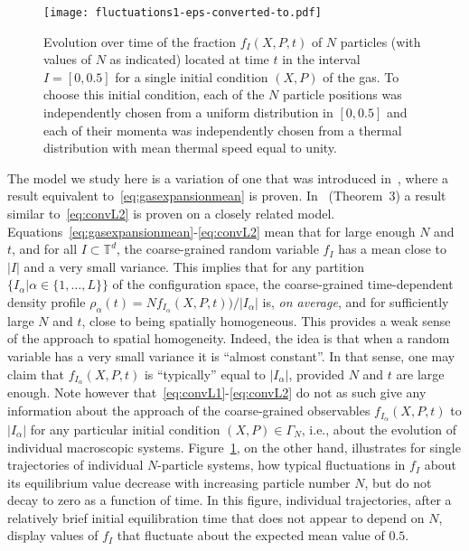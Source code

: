 \documentclass{article}
\newcommand {\T}{\mathbb{T}}
\numberwithin{equation}{section}
\begin{document}
\begin{figure}[t]
\captionsetup{width=0.85\textwidth}
\texttt{[image: fluctuations1-eps-converted-to.pdf]}
\centering
\caption{Evolution over time of the fraction $f_{I}(X,P,t)$ of $N$ particles (with values of $N$ as
indicated) located at time $t$ in the interval $I = [0,0.5]$ for a single initial
condition $(X,P)$ of the gas. To choose this initial condition, each of
the $N$ particle positions was independently chosen  from a uniform distribution in $[0, 0.5]$
and  each of their momenta was independently chosen from a thermal distribution with mean
thermal speed equal to unity.}
\label{fig:fluctuations1}
\end{figure}

The model we study here is a variation of one that was introduced in~\cite{Fr58},
where a result equivalent to~\eqref{eq:gasexpansionmean} is proven. In~\cite{Be10} (Theorem~3) a result similar to~\eqref{eq:convL2} is proven on a closely related model.
 Equations~\eqref{eq:gasexpansionmean}-\eqref{eq:convL2} mean
that for large enough $N$ and $t$, and for all $I\subset\T^{d}$, the
coarse-grained random variable $f_{I}$ has a mean close to $|I|$ and a very small
variance. This implies that for any partition $\{I_\alpha | \alpha\in\{1,\dots, L\}\} $
of the configuration space, the coarse-grained time-dependent density
profile $\rho_\alpha(t) = Nf_{I_\alpha} (X,P,t))/ |I_{\alpha}|$ is, \emph{on average}, and for sufficiently large $N$ and $t$, close to being spatially homogeneous.
This provides a weak sense of the approach to spatial homogeneity. Indeed, the idea is that when a random
variable has a very small variance it is ``almost constant''. In that sense, one may claim that $f_{I_\alpha}(X,P,t)$ is ``typically'' equal to $|I_\alpha|$, provided $N$ and $t$ are large enough.
Note however
that~\eqref{eq:convL1}-\eqref{eq:convL2} do not as such
give any information about the approach of the coarse-grained observables $f_{I_\alpha}(X,P,t)$ to $|I_\alpha|$ for any
particular initial condition $(X,P)\in\Gamma_{N}$, i.e., about the evolution of individual macroscopic
systems.
Figure~\ref{fig:fluctuations1}, on the other hand, illustrates for single trajectories of individual $N$-particle systems, how typical fluctuations in $f_I$ about its equilibrium value decrease with increasing particle number $N$, but do not decay to zero as a function of time. In this figure, individual trajectories, after a relatively brief initial equilibration time that does not appear to depend on $N$, display values of $f_I$ that fluctuate about the expected mean value of  $0.5$.
\end{document}
